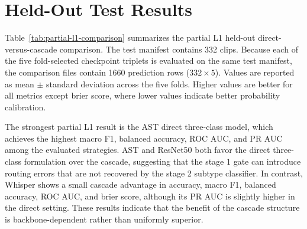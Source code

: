 \documentclass[11pt]{article}
\begin{document}
\section{Held-Out Test Results}

Table~\ref{tab:partial-l1-comparison} summarizes the partial L1 held-out
direct-versus-cascade comparison. The test manifest contains 332 clips. Because
each of the five fold-selected checkpoint triplets is evaluated on the same
test manifest, the comparison files contain 1660 prediction rows
($332 \times 5$). Values are reported as mean $\pm$ standard deviation across
the five folds. Higher values are better for all metrics except brier score,
where lower values indicate better probability calibration.

\begin{table}[htbp]
\centering
\caption{Partial L1 held-out direct-versus-cascade performance.}
\label{tab:partial-l1-comparison}
\end{table}

The strongest partial L1 result is the AST direct three-class model, which
achieves the highest macro F1, balanced accuracy, ROC AUC, and PR AUC among
the evaluated strategies. AST and ResNet50 both favor the direct three-class
formulation over the cascade, suggesting that the stage 1 gate can introduce
routing errors that are not recovered by the stage 2 subtype classifier. In
contrast, Whisper shows a small cascade advantage in accuracy, macro F1,
balanced accuracy, ROC AUC, and brier score, although its PR AUC is slightly
higher in the direct setting. These results indicate that the benefit of the
cascade structure is backbone-dependent rather than uniformly superior.
\end{document}

